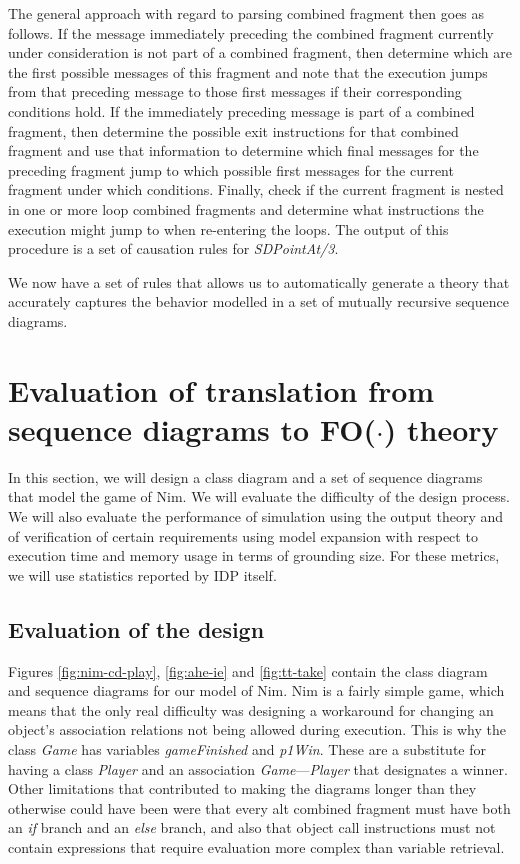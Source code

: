 \documentclass[conference]{IEEEtran}
\begin{document}
The general approach with regard to parsing combined fragment then goes as follows. If the message immediately preceding the combined fragment currently under consideration is not part of a combined fragment, then determine which are the first possible messages of this fragment and note that the execution jumps from that preceding message to those first messages if their corresponding conditions hold. If the immediately preceding message is part of a combined fragment, then determine the possible exit instructions for that combined fragment and use that information to determine which final messages for the preceding fragment jump to which possible first messages for the current fragment under which conditions. Finally, check if the current fragment is nested in one or more loop combined fragments and determine what instructions the execution might jump to when re-entering the loops. The output of this procedure is a set of causation rules for \textit{SDPointAt/3}.

We now have a set of rules that allows us to automatically generate a theory that accurately captures the behavior modelled in a set of mutually recursive sequence diagrams.

\section{Evaluation of translation from sequence diagrams to FO($\cdot$) theory}\label{sec:evaluation}

In this section, we will design a class diagram and a set of sequence diagrams that model the game of Nim. We will evaluate the difficulty of the design process. We will also evaluate the performance of simulation using the output theory and of verification of certain requirements using model expansion with respect to execution time and memory usage in terms of grounding size. For these metrics, we will use statistics reported by IDP itself.

\subsection{Evaluation of the design}
Figures \ref{fig:nim-cd-play}, \ref{fig:ahe-ie} and \ref{fig:tt-take} contain the class diagram and sequence diagrams for our model of Nim. Nim is a fairly simple game, which means that the only real difficulty was designing a workaround for changing an object's association relations not being allowed during execution. This is why the class \textit{Game} has variables \textit{gameFinished} and \textit{p1Win}. These are a substitute for having a class \textit{Player} and an association \textit{Game}---\textit{Player} that designates a winner. Other limitations that contributed to making the diagrams longer than they otherwise could have been were that every alt combined fragment must have both an \textit{if} branch and an \textit{else} branch, and also that object call instructions must not contain expressions that require evaluation more complex than variable retrieval.
\end{document}

